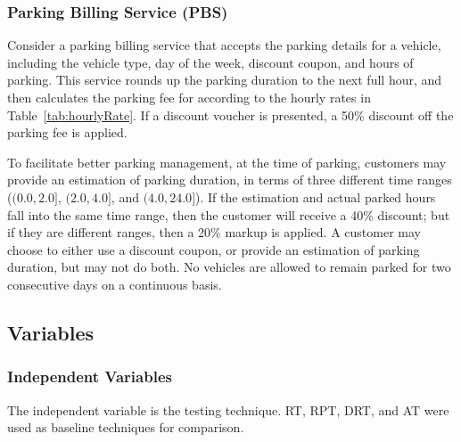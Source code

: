 \documentclass[10pt,journal,compsoc]{IEEEtran}
\begin{document}
\subsubsection{Parking Billing Service (PBS)}
\label{sec:pbs}

Consider a parking billing service that accepts the parking details for a vehicle, including the vehicle type, day of the week, discount coupon, and hours of parking.
This service  rounds up the parking duration to the next full hour, and then calculates the parking fee for according to the hourly rates in Table~\ref{tab:hourlyRate}.
If a discount voucher is presented, a 50\% discount off the parking fee is applied.

To facilitate better parking management, at the time of parking, customers may provide an estimation of parking duration, in terms of three different time ranges ($(0.0,2.0]$, $(2.0,4.0]$, and $(4.0,24.0]$).
If the estimation and actual parked hours fall into the same time range, then the customer will receive a 40\% discount;
but if they are different ranges, then a 20\% markup is applied.
A customer may choose to either use a discount coupon, or provide an estimation of parking duration, but may not do both.
No vehicles are allowed to remain parked for two consecutive days on a continuous basis.

\subsection{Variables}
\label{sec:variables}

\subsubsection{Independent Variables}
\label{sec:independentvariables}

The independent variable is the testing technique. RT, RPT, DRT, and AT \cite{cai2004optimal} were used as baseline techniques for comparison.
\end{document}
